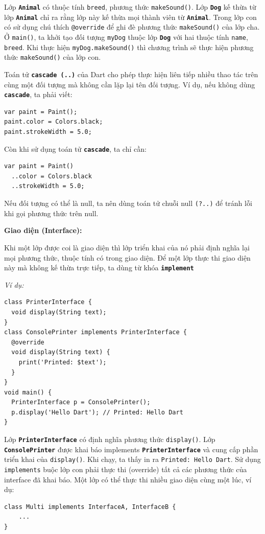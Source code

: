 \documentclass[../DoAn.tex]{subfiles}
\numberwithin{figure}{chapter}
\begin{document}
Lớp \textbf{\texttt{Animal}} có thuộc tính \texttt{breed}, phương thức \texttt{makeSound()}. Lớp \textbf{\texttt{Dog}} kế thừa từ lớp \textbf{\texttt{Animal}} chỉ ra rằng lớp này kế thừa mọi thành viên từ \textbf{\texttt{Animal}}. Trong lớp con có sử dụng chú thích \texttt{@override} để ghi đè phương thức \texttt{makeSound()} của lớp cha. Ở \texttt{main()}, ta khởi tạo đối tượng \texttt{myDog} thuộc lớp \textbf{\texttt{Dog}} với hai thuộc tính \texttt{name}, \texttt{breed}. Khi thực hiện \texttt{myDog.makeSound()} thì chương trình sẽ thực hiện phương thức \texttt{makeSound()} của lớp con.

Toán tử \textbf{\texttt{cascade (..)}} của Dart cho phép thực hiện liên tiếp nhiều thao tác trên cùng một đối tượng mà không cần lặp lại tên đối tượng. Ví dụ, nếu không dùng \textbf{\texttt{cascade}}, ta phải viết:
\begin{lstlisting}
var paint = Paint();
paint.color = Colors.black;
paint.strokeWidth = 5.0;
\end{lstlisting}

Còn khi sử dụng toán tử \textbf{\texttt{cascade}}, ta chỉ cần:
\begin{lstlisting}
var paint = Paint()
  ..color = Colors.black
  ..strokeWidth = 5.0;
\end{lstlisting}

Nếu đối tượng có thể là null, ta nên dùng toán tử chuỗi null \texttt{(?..)} để tránh lỗi khi gọi phương thức trên null.

\textbf{Giao diện (Interface):} 

Khi một lớp được coi là giao diện thì lớp triển khai của nó phải định nghĩa lại mọi phương thức, thuộc tính có trong giao diện. Để một lớp thực thi giao diện này mà không kế thừa trực tiếp, ta dùng từ khóa 
\textbf{\texttt{implement}} 

\textit{Ví dụ:}
\begin{lstlisting}
class PrinterInterface {
  void display(String text);
}
class ConsolePrinter implements PrinterInterface {
  @override
  void display(String text) {
    print('Printed: $text');
  }
}
void main() {
  PrinterInterface p = ConsolePrinter();
  p.display('Hello Dart'); // Printed: Hello Dart
}
\end{lstlisting}

Lớp \textbf{\texttt{PrinterInterface}} có định nghĩa phương thức \texttt{display()}. Lớp \textbf{\texttt{ConsolePrinter}} được khai báo implements \textbf{\texttt{PrinterInterface}} và cung cấp phần triển khai của \texttt{display()}. Khi chạy, ta thấy in ra \texttt{Printed: Hello Dart}. Sử dụng \texttt{implements} buộc lớp con phải thực thi (override) tất cả các phương thức của interface đã khai báo.
Một lớp có thể thực thi nhiều giao diện cùng một lúc, ví dụ:
\begin{lstlisting}
class Multi implements InterfaceA, InterfaceB {
    ...
}
\end{lstlisting}
\end{document}
